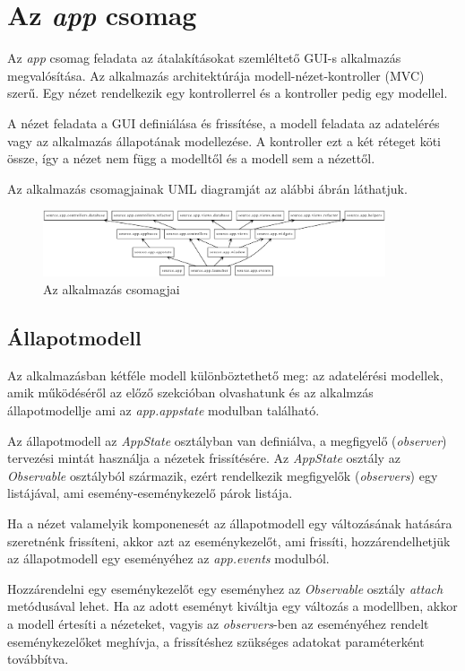 \section{Az \emph{app} csomag}

Az \emph{app} csomag feladata az átalakításokat szemléltető GUI-s alkalmazás megvalósítása.
Az alkalmazás architektúrája modell-nézet-kontroller (MVC) szerű.
Egy nézet rendelkezik egy kontrollerrel és a kontroller pedig egy modellel.

A nézet feladata a GUI definiálása és frissítése,
a modell feladata az adatelérés vagy az alkalmazás állapotának modellezése.
A kontroller ezt a két réteget köti össze,
így a nézet nem függ a modelltől és a modell sem a nézettől.

Az alkalmazás csomagjainak UML diagramját az alábbi ábrán láthatjuk.

\begin{figure}[H]
	\centering
	\includegraphics[width=0.9\textwidth]{images/uml/apppackages.eps}
	\caption{Az alkalmazás csomagjai}
\end{figure}

\subsection{Állapotmodell}
\label{subsec:appstate}

Az alkalmazásban kétféle modell különböztethető meg:
az adatelérési modellek, amik működéséről az előző szekcióban olvashatunk
és az alkalmzás állapotmodellje ami az \emph{app.appstate} modulban található.

Az állapotmodell az \emph{AppState} osztályban van definiálva,
a megfigyelő (\emph{observer}) tervezési mintát használja a nézetek frissítésére.
Az \emph{AppState} osztály az \emph{Observable} osztályból származik,
ezért rendelkezik megfigyelők (\emph{observers}) egy listájával,
ami esemény-eseménykezelő párok listája.

Ha a nézet valamelyik komponenesét az állapotmodell egy változásának hatására szeretnénk frissíteni,
akkor azt az eseménykezelőt, ami frissíti,
hozzárendelhetjük az állapotmodell egy eseményéhez az \emph{app.events} modulból.

Hozzárendelni egy eseménykezelőt egy eseményhez az \emph{Observable} osztály
\emph{attach} metódusával lehet.
Ha az adott eseményt kiváltja egy változás a modellben, akkor a modell értesíti a
nézeteket,
vagyis az \emph{observers}-ben az eseményéhez rendelt eseménykezelőket meghívja,
a frissítéshez szükséges adatokat paraméterként továbbítva.

